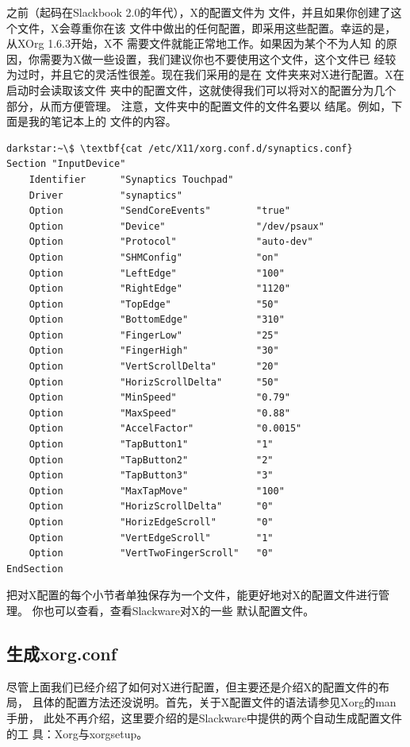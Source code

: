之前（起码在Slackbook 2.0的年代），X的配置文件为
文件，并且如果你创建了这个文件，X会尊重你在该
文件中做出的任何配置，即采用这些配置。幸运的是，从XOrg 1.6.3开始，X不
需要文件就能正常地工作。如果因为某个不为人知
的原因，你需要为X做一些设置，我们建议你也不要使用这个文件，这个文件已
经较为过时，并且它的灵活性很差。现在我们采用的是在
文件夹来对X进行配置。X在启动时会读取该文件
夹中的配置文件，这就使得我们可以将对X的配置分为几个部分，从而方便管理。
注意，文件夹中的配置文件的文件名要以
结尾。例如，下面是我的笔记本上的
文件的内容。

\begin{Verbatim}[frame=single, commandchars=\\\{\}]
darkstar:~\$ \textbf{cat /etc/X11/xorg.conf.d/synaptics.conf}
Section "InputDevice"
    Identifier      "Synaptics Touchpad"
    Driver          "synaptics"
    Option          "SendCoreEvents"        "true"
    Option          "Device"                "/dev/psaux"
    Option          "Protocol"              "auto-dev"
    Option          "SHMConfig"             "on"
    Option          "LeftEdge"              "100"
    Option          "RightEdge"             "1120"
    Option          "TopEdge"               "50"
    Option          "BottomEdge"            "310"
    Option          "FingerLow"             "25"
    Option          "FingerHigh"            "30"
    Option          "VertScrollDelta"       "20"
    Option          "HorizScrollDelta"      "50"
    Option          "MinSpeed"              "0.79"
    Option          "MaxSpeed"              "0.88"
    Option          "AccelFactor"           "0.0015"
    Option          "TapButton1"            "1"
    Option          "TapButton2"            "2"
    Option          "TapButton3"            "3"
    Option          "MaxTapMove"            "100"
    Option          "HorizScrollDelta"      "0"
    Option          "HorizEdgeScroll"       "0"
    Option          "VertEdgeScroll"        "1"
    Option          "VertTwoFingerScroll"   "0"
EndSection
\end{Verbatim}
把对X配置的每个小节者单独保存为一个文件，能更好地对X的配置文件进行管理。
你也可以查看，查看Slackware对X的一些
默认配置文件。


\subsection{生成xorg.conf}
\label{chap:xconfiguration:configuration:generateXorg}
尽管上面我们已经介绍了如何对X进行配置，但主要还是介绍X的配置文件的布局，
且体的配置方法还没说明。首先，关于X配置文件的语法请参见Xorg的man手册，
此处不再介绍，这里要介绍的是Slackware中提供的两个自动生成配置文件的工
具：Xorg与xorgsetup。

